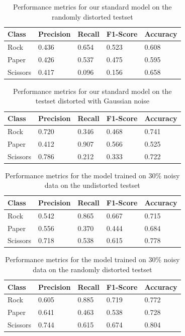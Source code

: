 \documentclass[a4paper]{article}
\begin{document}
\begin{table}[H]
	\centering
	\caption{Performance metrics for our standard model on the randomly distorted testset}
	\label{tbl:metrics_model_rm}
	\begin{tabular}{@{}lllll@{}}
		\toprule
		Class    & Precision & Recall & F1-Score & Accuracy \\ \midrule
		Rock     & 0.436     & 0.654  & 0.523    & 0.608    \\
		Paper    & 0.426     & 0.537  & 0.475    & 0.595    \\
		Scissors & 0.417     & 0.096  & 0.156    & 0.658    \\ \bottomrule
	\end{tabular}
\end{table}

\begin{table}[H]
	\centering
	\caption{Performance metrics for our standard model on the testset distorted with Gaussian noise}
	\label{tbl:metrics_model_gauss}
	\begin{tabular}{@{}lllll@{}}
		\toprule
		Class    & Precision & Recall & F1-Score & Accuracy \\ \midrule
		Rock     & 0.720     & 0.346  & 0.468    & 0.741    \\
		Paper    & 0.412     & 0.907  & 0.566    & 0.525    \\
		Scissors & 0.786     & 0.212  & 0.333    & 0.722    \\ \bottomrule
	\end{tabular}
\end{table}

\begin{table}[H]
	\centering
	\caption{Performance metrics for the model trained on 30\% noisy data on the undistorted testset}
	\label{tbl:noisy_model_noDis}
	\begin{tabular}{@{}lllll@{}}
		\toprule
		Class    & Precision & Recall & F1-Score & Accuracy \\ \midrule
		Rock     & 0.542     & 0.865  & 0.667    & 0.715    \\
		Paper    & 0.556     & 0.370  & 0.444    & 0.684    \\
		Scissors & 0.718     & 0.538  & 0.615    & 0.778    \\ \bottomrule
	\end{tabular}
\end{table}

\begin{table}[H]
	\centering
	\caption{Performance metrics for the model trained on 30\% noisy data on the randomly distorted testset}
	\label{tbl:noisy_model_rm}
	\begin{tabular}{@{}lllll@{}}
		\toprule
		Class    & Precision & Recall & F1-Score & Accuracy \\ \midrule
		Rock     & 0.605     & 0.885  & 0.719    & 0.772    \\
		Paper    & 0.641     & 0.463  & 0.538    & 0.728    \\
		Scissors & 0.744     & 0.615  & 0.674    & 0.804    \\ \bottomrule
	\end{tabular}
\end{table}
\end{document}
